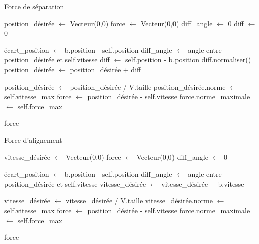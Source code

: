 \documentclass{article}
\begin{document}
\begin{algorithm}[H]
    \caption{Force de séparation}
    \begin{algorithmic}
        \STATE position\_désirée $\leftarrow$ Vecteur(0,0)
        \STATE force $\leftarrow$ Vecteur(0,0)
        \STATE diff\_angle $\leftarrow$ 0
        \STATE diff $\leftarrow$ 0

        \medbreak

        \STATE écart\_position $\leftarrow$ b.position - self.position
        \STATE diff\_angle $\leftarrow$ angle entre position\_désirée et self.vitesse
        \STATE diff $\leftarrow$ self.position - b.position
        \STATE diff.normaliser()
        \STATE position\_désirée $\leftarrow$ position\_désirée + diff
        \ENDIF
        \ENDFOR


        \medbreak

        \STATE position\_désirée $\leftarrow$ position\_désirée / V.taille
        \STATE position\_désirée.norme $\leftarrow$ self.vitesse\_max
        \STATE force $\leftarrow$ position\_désirée - self.vitesse
        \STATE force.norme\_maximale $\leftarrow$ self.force\_max

        \ENDIF

        \medbreak
        \RETURN force


    \end{algorithmic}
\end{algorithm}


\begin{algorithm}[H]
    \caption{Force d'alignement}
    \begin{algorithmic}
        \STATE vitesse\_désirée $\leftarrow$ Vecteur(0,0)
        \STATE force $\leftarrow$ Vecteur(0,0)
        \STATE diff\_angle $\leftarrow$ 0

        \medbreak

        \STATE écart\_position $\leftarrow$ b.position - self.position
        \STATE diff\_angle $\leftarrow$ angle entre position\_désirée et self.vitesse
        \STATE vitesse\_désirée $\leftarrow$ vitesse\_désirée + b.vitesse
        \ENDIF
        \ENDFOR


        \medbreak

        \STATE vitesse\_désirée $\leftarrow$ vitesse\_désirée / V.taille
        \STATE vitesse\_désirée.norme $\leftarrow$ self.vitesse\_max
        \STATE force $\leftarrow$ position\_désirée - self.vitesse
        \STATE force.norme\_maximale $\leftarrow$ self.force\_max

        \ENDIF

        \medbreak
        \RETURN force


    \end{algorithmic}
\end{algorithm}
\end{document}
